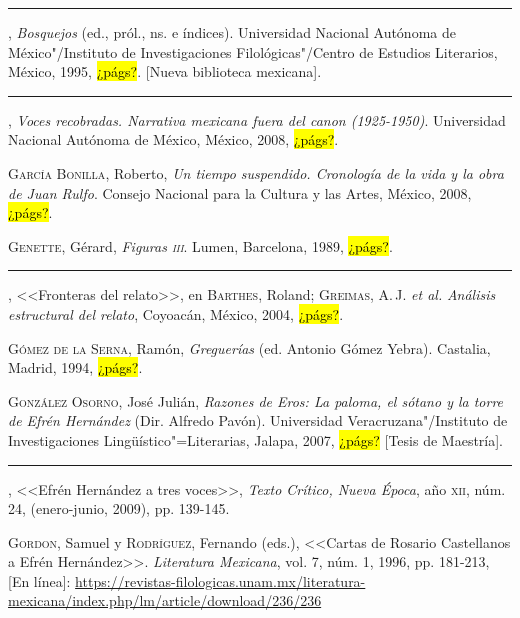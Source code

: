 \documentclass[14pt,twoside,final]{extbook} %
\begin{document}
\rule{1cm}{0.4pt}, \emph{Bosquejos} (ed., pról., ns. e índices). Universidad Nacional Autónoma de México"/Instituto de Investigaciones Filológicas"/Centro de Estudios Literarios, México, 1995, \hl{¿págs?}. [Nueva biblioteca mexicana].\label{bib:franco1995}

\rule{1cm}{0.4pt}, \emph{Voces recobradas. Narrativa mexicana fuera del canon (1925-1950)}. Universidad Nacional Autónoma de México, México, 2008, \hl{¿págs?}.\label{bib:franco2008}

\textsc{García Bonilla}, Roberto, \emph{Un tiempo suspendido. Cronología de la vida y la obra de Juan Rulfo}. Consejo Nacional para la Cultura y las Artes, México, 2008, \hl{¿págs?}.\label{bib:garcia2008}

\textsc{Genette}, Gérard, \emph{Figuras \textsc{iii}}. Lumen, Barcelona, 1989, \hl{¿págs?}.\label{bib:genette1989}

\rule{1cm}{0.4pt}, <<Fronteras del relato>>, en \textsc{Barthes}, Roland; \textsc{Greimas}, A.\,J. \emph{et al.} \emph{Análisis estructural del relato}, Coyoacán,  México, 2004, \hl{¿págs?}.\label{bib:genette2004}

\textsc{Gómez de la Serna}, Ramón, \emph{Greguerías} (ed. Antonio Gómez Yebra). Castalia, Madrid, 1994, \hl{¿págs?}.\label{bib:gomez1994}

\textsc{González Osorno}, José Julián, \emph{Razones de Eros: \emph{La paloma, el sótano y la torre} de Efrén Hernández} (Dir. Alfredo Pavón). Universidad Veracruzana"/Instituto de Investigaciones Lingüístico"=Literarias, Jalapa, 2007, \hl{¿págs?} [Tesis de Maestría].\label{bib:gonzalez2007}

\rule{1cm}{0.4pt}, <<Efrén Hernández a tres voces>>, \emph{Texto Crítico, Nueva Época}, año \textsc{xii}, núm. 24, (enero-junio, 2009), pp. 139-145.\label{bib:gonzalez2009}

\textsc{Gordon}, Samuel y \textsc{Rodríguez}, Fernando (eds.), <<Cartas de Rosario Castellanos a Efrén Hernández>>. \emph{Literatura Mexicana}, vol. 7, núm. 1, 1996, pp. 181-213, [En línea]: \href{https://revistas-filologicas.unam.mx/literatura-mexicana/index.php/lm/article/download/236/236}{https://revistas-filologicas.unam.mx/literatura-mexicana/index.php/lm/article/download/236/236}\label{bib:gordon-rodriguez1996} 
\end{document}
